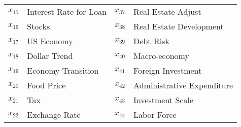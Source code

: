 \documentclass[10pt]{article}
\begin{document}
\begin{table}[ht!]
\begin{center}
\begin{tabular}{cp{5.5cm}|cp{5.5cm}}
$x_{15}$	&	Interest Rate for Loan                                                  &     $x_{37}$	&	Real Estate Adjust	\\
$x_{16}$	&	Stocks	                                                                    &	$x_{38}$	&	Real Estate Development	\\
$x_{17}$	&	US Economy	                                                            &	$x_{39}$	&	Debt Risk	\\
$x_{18}$    &	Dollar Trend	                                                           &	$x_{40}$	&	Macro-economy 	\\
$x_{19}$	&	Economy Transition                                                     &	$x_{41}$	&	Foreign Investment	\\
$x_{20}$	&	Food Price	                                                            &	$x_{42}$	&	Administrative Expenditure	\\
$x_{21}$	&	Tax	                                                                            &	$x_{43}$	&	Investment Scale	\\
$x_{22}$	&	Exchange Rate	                                                            &	$x_{44}$	&	Labor Force	\\
\hline							
	
	\end{tabular}
	\end{center}
	
	\end{table}
	
\end{document}

